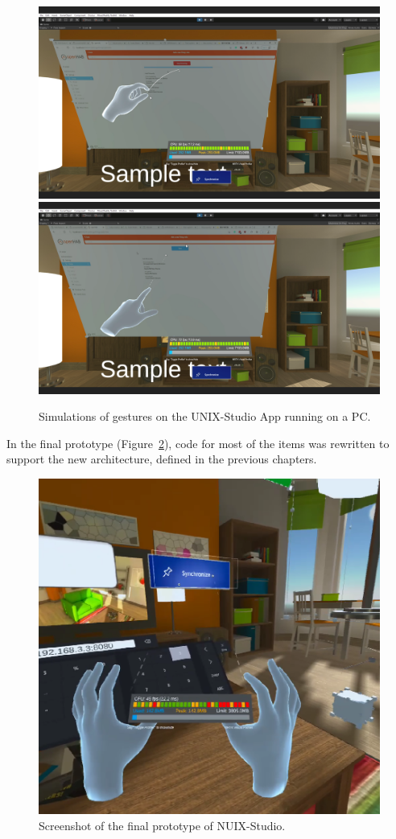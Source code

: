 \begin{figure}
  \centering
    {\includegraphics[width=0.45\linewidth]{figures/InputSimulation1.png}}
    {\includegraphics[width=0.45\linewidth]{figures/InputSimulation2.png}}
  \caption{Simulations of gestures on the UNIX-Studio App running on a PC.}
  \label{fig:InputSimulation-figure}
\end{figure}


In the final prototype (Figure~\ref{fig:FinalPrototype-figure}), code for most of the items was rewritten to support the new architecture, defined in the previous chapters. 


\begin{figure}
  \centering
  \includegraphics[width=0.6\linewidth]{figures/FinalPrototype.png}
  \caption{Screenshot of the final prototype of NUIX-Studio.}
  \label{fig:FinalPrototype-figure}
\end{figure}